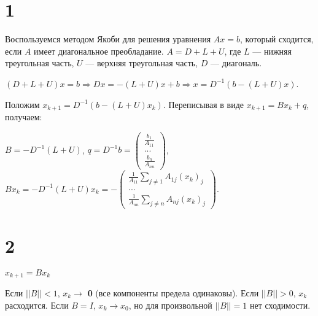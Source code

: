 \documentclass[12pt,a4paper]{article}
\begin{document}
\section*{1}
Воспользуемся методом Якоби для решения уравнения $Ax=b$, который сходится, если $A$ имеет диагональное преобладание. $A=D+L+U$, где $L$ --- нижняя треугольная часть, $U$ --- верхняя треугольная часть, $D$ --- диагональ. 

$(D+L+U)x=b \Rightarrow Dx=-(L+U)x+b \Rightarrow x=D^{-1}(b-(L+U)x)$. 

Положим $x_{k+1}=D^{-1}(b-(L+U)x_k)$. Переписывая в виде $x_{k+1}=Bx_k+q$, получаем:

$B=-D^{-1}(L+U)$, 
$q=D^{-1}b=\begin{pmatrix}
    \frac{b_1}{A_{11}} \\
    ...\\
    \frac{b_n}{A_{nn}}
\end{pmatrix}$,
$Bx_k=-D^{-1}(L+U)x_k=-\begin{pmatrix}
    \frac{1}{A_{11}}\sum\limits_{j\not=1} A_{1j}(x_k)_j \\
    ... \\
    \frac{1}{A_{nn}}\sum\limits_{j\not=n} A_{nj}(x_k)_j
\end{pmatrix}$.

\section*{2}
$x_{k+1}=Bx_k$

Если $||B||<1$, $x_k \rightarrow$ \textbf{0} (все компоненты предела одинаковы).
Если $||B||>0$, $x_k$ расходится. 
Если $B=I$, $x_k \rightarrow x_0$, но для произвольной $||B||=1$ нет сходимости.
\end{document}
